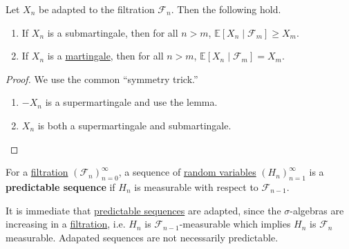 	\begin{corollary}
	  \label{thm:multi-step-submartingale-and-martingale}
	  Let $X_n$ be adapted to the filtration $\mathscr{F}_n$. Then the following hold. 
		\begin{enumerate}
			\item If $X_n$ is a submartingale, then for all $n > m$, $\mathbb{E}[X_n \mid \mathscr{F}_m] \geq X_m$. 
			\item If $X_n$ is a  \hyperref[def:martingale]{martingale}, then for all $n > m$, $\mathbb{E}[X_n \mid \mathscr{F}_m] = X_m$. 
		\end{enumerate}
	\end{corollary}
	\begin{proof}
		We use the common ``symmetry trick.''
		\begin{enumerate}
		  \item $-X_n$ is a supermartingale and use the lemma. 
			\item $X_n$ is both a supermartingale and submartingale. 
		\end{enumerate}
	\end{proof}

	\begin{definition}
	  \label{def:predictable-sequence}
		For a \hyperref[def:filtration-2]{filtration} $(\mathscr{F}_n)_{n=0}^\infty$, a sequence of \hyperref[def:random-variable]{random variables} $(H_n)_{n=1}^\infty$ is a \textbf{predictable sequence} if $H_n$ is measurable with respect to $\mathscr{F}_{n-1}$. 
	\end{definition}

	It is immediate that \hyperref[def:predictable-sequence]{predictable sequences} are adapted, since the $\sigma$-algebras are increasing in a \hyperref[def:filtration-2]{filtration}, i.e. $H_n$ is $\mathscr{F}_{n-1}$-measurable which implies $H_n$ is $\mathscr{F}_n$ measurable. Adapated sequences are not necessarily predictable. 

